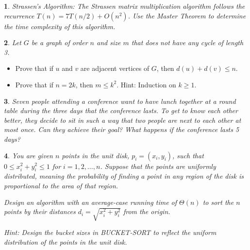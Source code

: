 \documentclass[%
addpoints]{exam}
\theoremstyle{problem}
\newtheorem{p}{}
\begin{document}
\begin{p}
Strassen’s Algorithm: The Strassen matrix multiplication algorithm follows the recurrence \(T(n) = 7T(n/2) + O(n^2)\). Use the Master Theorem to determine the time complexity of this algorithm.  
\hfill\end{p}

\begin{p}
Let \( G \) be a graph of order \( n \) and size \( m \) that does not have any cycle of length 3.
\hfill\end{p}
\begin{itemize}
    \item Prove that if \( u \) and \( v \) are adjacent vertices of \( G \), then \( d(u) + d(v) \leq n \).
    \item Prove that if \( n = 2k \), then \( m \leq k^2 \). Hint: Induction on \( k \geq 1 \).
\end{itemize}

\begin{p}
Seven people attending a conference want to have lunch together at a round table during the three days that the conference lasts. To get to know each other better, they decide to sit in such a way that two people are next to each other at most once. Can they achieve their goal? What happens if the conference lasts 5 days?  
\hfill\end{p}

\begin{p}
You are given \( n \) points in the unit disk, \( p_i = (x_i, y_i) \), such that \( 0 \leq x_i^2 + y_i^2 \leq 1 \) for \( i = 1, 2, \dots, n \). Suppose that the points are uniformly distributed, meaning the probability of finding a point in any region of the disk is proportional to the area of that region.  

Design an algorithm with an average-case running time of \( \Theta(n) \) to sort the \( n \) points by their distances \( d_i = \sqrt{x_i^2 + y_i^2} \) from the origin.  

Hint: Design the bucket sizes in BUCKET-SORT to reflect the uniform distribution of the points in the unit disk.  
\hfill\end{p}
\end{document}
